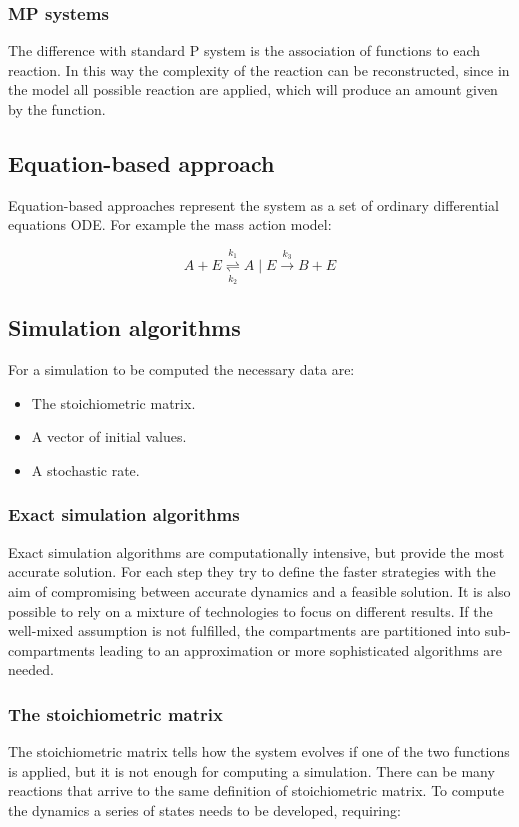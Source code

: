     \subsubsection{MP systems}
    The difference with standard P system is the association of functions to each reaction.
    In this way the complexity of the reaction can be reconstructed, since in the model all possible reaction are applied, which will produce an amount given by the function.

  \subsection{Equation-based approach}
  Equation-based approaches represent the system as a set of ordinary differential equations ODE.
  For example the mass action model:

  $$A+E \underset{k_2}{\overset{k_1}{\rightleftharpoons}}A \mid E \stackrel{k_3}{\longrightarrow}B+E$$

  \subsection{Simulation algorithms}
  For a simulation to be computed the necessary data are:

  \begin{multicols}{2}
    \begin{itemize}
      \item The stoichiometric matrix.
      \item A vector of initial values.
      \item A stochastic rate.
    \end{itemize}
  \end{multicols}

    \subsubsection{Exact simulation algorithms}
    Exact simulation algorithms are computationally intensive, but provide the most accurate solution.
    For each step they try to define the faster strategies with the aim of compromising between accurate dynamics and a feasible solution.
    It is also possible to rely on a mixture of technologies to focus on different results.
    If the well-mixed assumption is not fulfilled, the compartments are partitioned into sub-compartments leading to an approximation or more sophisticated algorithms are needed.

    \subsubsection{The stoichiometric matrix}
    The stoichiometric matrix tells how the system evolves if one of the two functions is applied, but it is not enough for computing a simulation.
    There can be many reactions that arrive to the same definition of stoichiometric matrix.
    To compute the dynamics a series of states needs to be developed, requiring:

